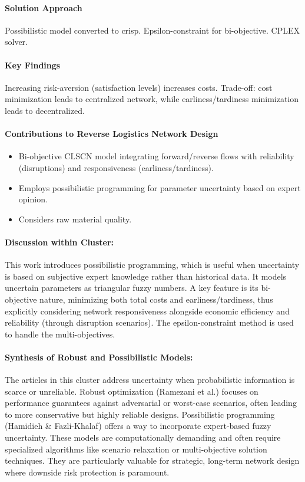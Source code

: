 \paragraph{Solution Approach} Possibilistic model converted to crisp. Epsilon-constraint for bi-objective. CPLEX solver.
\paragraph{Key Findings} Increasing risk-aversion (satisfaction levels) increases costs. Trade-off: cost minimization leads to centralized network, while earliness/tardiness minimization leads to decentralized.
\paragraph{Contributions to Reverse Logistics Network Design}
\begin{itemize}
    \item Bi-objective CLSCN model integrating forward/reverse flows with reliability (disruptions) and responsiveness (earliness/tardiness).
    \item Employs possibilistic programming for parameter uncertainty based on expert opinion.
    \item Considers raw material quality.
\end{itemize}
\paragraph{Discussion within Cluster:} This work introduces possibilistic programming, which is useful when uncertainty is based on subjective expert knowledge rather than historical data. It models uncertain parameters as triangular fuzzy numbers. A key feature is its bi-objective nature, minimizing both total costs and earliness/tardiness, thus explicitly considering network responsiveness alongside economic efficiency and reliability (through disruption scenarios). The epsilon-constraint method is used to handle the multi-objectives.

\paragraph{Synthesis of Robust and Possibilistic Models:}
The articles in this cluster address uncertainty when probabilistic information is scarce or unreliable. Robust optimization (Ramezani et al.) focuses on performance guarantees against adversarial or worst-case scenarios, often leading to more conservative but highly reliable designs. Possibilistic programming (Hamidieh \& Fazli-Khalaf) offers a way to incorporate expert-based fuzzy uncertainty. These models are computationally demanding and often require specialized algorithms like scenario relaxation or multi-objective solution techniques. They are particularly valuable for strategic, long-term network design where downside risk protection is paramount.